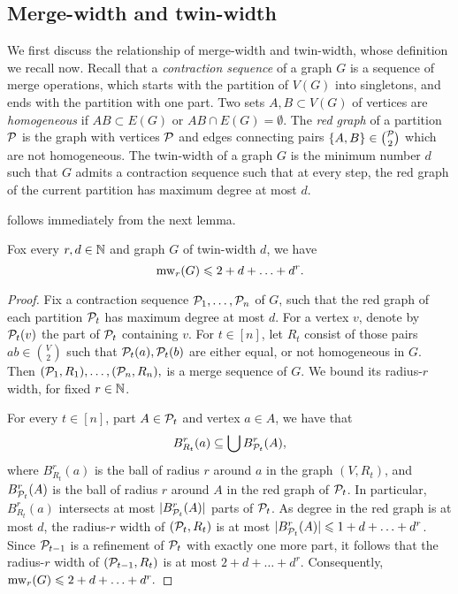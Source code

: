 \subsection{Merge-width and twin-width}\label{sec:tww}
We first discuss the relationship of merge-width and twin-width,
whose definition we recall now.
Recall that a \emph{contraction sequence} of a graph $G$ is a sequence of merge operations, which starts with the partition of $V(G)$ into singletons, and ends with the partition with one part.
Two sets $A,B\subset V(G)$ of vertices are \emph{homogeneous} if $AB\subset E(G)$ or $AB\cap E(G)=\emptyset$.
The \emph{red graph} of a partition $\cal P$
is the graph with vertices $\cal P$ and edges connecting pairs $\set{A,B}\in{\cal P\choose 2}$ 
which are not homogeneous. The twin-width of a graph $G$ is the minimum number $d$ 
such that $G$ admits a contraction sequence such that at every step, the red graph of the current partition has maximum degree at most $d$.


\twwintro*
{} follows immediately from the next lemma.
\begin{lemma}\label{lem:tww}
  Fox every $r,d\in \N$ and graph $G$ of twin-width $d$, we have 
  $$\mw_r(G)\le 2+d+\ldots+d^r.$$
\end{lemma}
\begin{proof}
Fix a contraction sequence $\cal P_1,\ldots,\cal P_n$ of $G$, such that
the red graph of each partition $\cal P_t$ has maximum degree at most $d$.
For a vertex \(v\), denote by \(\cal P_t(v)\) the part of \(\cal P_t\) containing \(v\).
For $t\in[n]$, let $R_t$ consist of those pairs $ab\in {V\choose 2}$ such that $\cal P_t(a),\cal P_t(b)$ are either equal, or not homogeneous in $G$.
Then 
  $(\cal P_1,R_1),\ldots,(\cal P_n,R_n),$
  is a merge sequence of $G$. We bound its radius-$r$ width, for fixed $r\in\N$.

  For every $t\in[n]$, part $A\in\cal P_t$ and vertex $a\in A$, 
  we have that 
  \begin{align}\label{eq:tww-mw}
  B^r_{R_t}(a)\subset \bigcup B^r_{\cal P_t}(A),  
  \end{align}
  where $B^r_{R_t}(a)$ is the ball of radius $r$ around $a$ in the graph $(V,R_t)$, 
  and $B^r_{\cal P_t}(A)$ is the ball of radius $r$ around $A$ in the red graph of $\cal P_t$.
  In particular, $B^r_{R_t}(a)$ intersects at most $|B^r_{\cal P_t}(A)|$ parts of $\cal P_t$.
  As degree in the red graph is at most \(d\), the radius-$r$ width of $(\cal P_t,R_t)$ is at most $|B^r_{\cal P_t}(A)|\le 1+d+\ldots+d^r$.
  Since $\cal P_{t-1}$ is a refinement of $\cal P_t$ with exactly one more part,
  it follows that 
  the radius-$r$ width of $(\cal P_{t-1},R_t)$ is at most $2+d+\ldots+d^r$.
Consequently,
$\mw_r(G)\le 2+d+\ldots+d^r.$
\end{proof}


